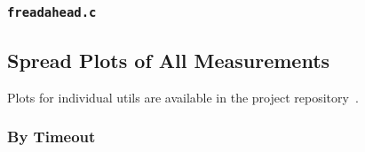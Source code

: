 \documentclass{article}
\let\savedCite=\cite
\renewcommand{\cite}{\unskip~\savedCite}
\begin{document}
\subsubsection{\texorpdfstring{\lstinline{freadahead.c}}{freadahead.c}}


\clearpage
\subsection{Spread Plots of All Measurements}
\label{AppendixPlots}

Plots for individual utils are available in the project repository\cite{GitHub}.

\subsubsection{By Timeout}
\end{document}
